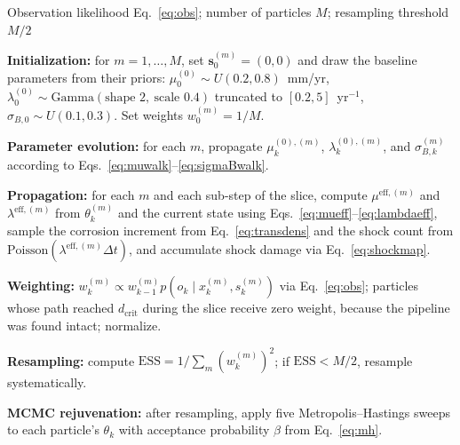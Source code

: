 \documentclass[journal]{IEEEtran}
\begin{document}
\begin{algorithm}[t]
\caption{Sequential Monte Carlo with MCMC Rejuvenation}
\label{alg:smc}
\begin{algorithmic}[1]

\Require Observation likelihood Eq.~\eqref{eq:obs}; number of
particles $M$; resampling threshold $M/2$

\State \textbf{Initialization:}
for $m=1,\dots,M$, set $\mathbf{s}_0^{(m)}=(0,0)$ and draw the baseline
parameters from their priors:
$\mu_0^{(0)}\sim U(0.2,0.8)$~mm/yr,
$\lambda_0^{(0)}\sim\mathrm{Gamma}(\text{shape }2,\ \text{scale }0.4)$
truncated to $[0.2,5]$~yr$^{-1}$,
$\sigma_{B,0}\sim U(0.1,0.3)$.
Set weights $w_0^{(m)}=1/M$.


    \State \textbf{Parameter evolution:}
    for each $m$, propagate
    $\mu_k^{(0),(m)}$,
    $\lambda_k^{(0),(m)}$, and
    $\sigma_{B,k}^{(m)}$
    according to
    Eqs.~\eqref{eq:muwalk}--\eqref{eq:sigmaBwalk}.

    \State \textbf{Propagation:}
    for each $m$ and each sub-step of the slice, compute
    $\mu^{\mathrm{eff},(m)}$ and $\lambda^{\mathrm{eff},(m)}$ from
    $\theta_k^{(m)}$ and the current state using
    Eqs.~\eqref{eq:mueff}--\eqref{eq:lambdaeff}, sample the corrosion
    increment from Eq.~\eqref{eq:transdens} and the shock count from
    $\mathrm{Poisson}(\lambda^{\mathrm{eff},(m)}\Delta t)$, and
    accumulate shock damage via Eq.~\eqref{eq:shockmap}.


        \State \textbf{Weighting:}
        $w_k^{(m)}
        \propto
        w_{k-1}^{(m)}
        p(o_k\mid x_k^{(m)},s_k^{(m)})$
        via Eq.~\eqref{eq:obs}; particles whose path reached
        $d_{\mathrm{crit}}$ during the slice receive zero weight, because
        the pipeline was found intact; normalize.

        \State \textbf{Resampling:}
        compute
        $\mathrm{ESS}
        =
        1/\sum_m(w_k^{(m)})^2$;
        if $\mathrm{ESS}<M/2$, resample systematically.

        \State \textbf{MCMC rejuvenation:}
        after resampling, apply five Metropolis--Hastings sweeps to each
        particle's $\theta_k$ with acceptance probability $\beta$ from
        Eq.~\eqref{eq:mh}.

    \EndIf

\EndFor

\end{algorithmic}
\end{algorithm}
\end{document}
